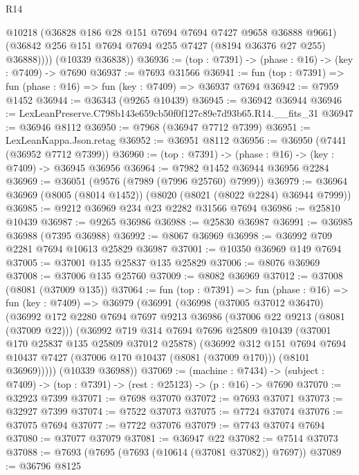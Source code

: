\begin{lexlean}{R14}
\begin{coremodule}
            @10218
            (@36828 @186 @28 @151 @7694 @7694 @7427 @9658 @36888 @9661)
            (@36842 @256 @151 @7694 @7694 @255 @7427 (@8194 @36376 @27 @255) @36888))))
      (@10339 @36838))
@36936 := (top : @7391) -> (phase : @16) -> (key : @7409) -> @7690
@36937 := @7693 @31566
@36941 := fun (top : @7391) => fun (phase : @16) => fun (key : @7409) => @36937 @7694
@36942 := @7959 @1452
@36944 := @36343 (@9265 @10439)
@36945 := @36942 @36944
@36946 := LexLeanPreserve.C798b143e659cb50f0f127c89e7d93b65.R14.__fits_31
@36947 := @36946 @8112
@36950 := @7968 (@36947 @7712 @7399)
@36951 := LexLeanKappa.Json.retag
@36952 := @36951 @8112
@36956 := @36950 (@7441 (@36952 @7712 @7399))
@36960 := (top : @7391) -> (phase : @16) -> (key : @7409) -> @36945 @36956
@36964 := @7982 @1452 @36944 @36956 @2284
@36969 := @36051 (@9576 (@7989 (@7996 @25760) @7999))
@36979 := @36964 @36969 (@8005 (@8014 @1452)) (@8020 (@8021 (@8022 @2284) @36944 @7999))
@36985 := @9212 @36969 @234 @23 @2282 @31566 @7694
@36986 := @25810 @10439
@36987 := @9265 @36986
@36988 := @25830 @36987
@36991 := @36985 @36988 (@7395 @36988)
@36992 := @8067 @36969
@36998 := @36992 @709 @2281 @7694 @10613 @25829 @36987
@37001 := @10350 @36969 @149 @7694
@37005 := @37001 @135 @25837 @135 @25829
@37006 := @8076 @36969
@37008 := @37006 @135 @25760
@37009 := @8082 @36969
@37012 := @37008 (@8081 (@37009 @135))
@37064 := fun (top : @7391) =>
  fun (phase : @16) =>
  fun (key : @7409) =>
  @36979
    (@36991
      (@36998
        (@37005 @37012 @36470)
        (@36992
          @172
          @2280
          @7694
          @7697
          @9213
          @36986
          (@37006 @22 @9213 (@8081 (@37009 @22)))
          (@36992
            @719
            @314
            @7694
            @7696
            @25809
            @10439
            (@37001 @170 @25837 @135 @25809 @37012 @25878)
            (@36992
              @312
              @151
              @7694
              @7694
              @10437
              @7427
              (@37006 @170 @10437 (@8081 (@37009 @170)))
              (@8101 @36969)))))
      (@10339 @36988))
@37069 := (machine : @7434) ->
  (subject : @7409) -> (top : @7391) -> (rest : @25123) -> (p : @16) -> @7690
@37070 := @32923 @7399
@37071 := @7698 @37070
@37072 := @7693 @37071
@37073 := @32927 @7399
@37074 := @7522 @37073
@37075 := @7724 @37074
@37076 := @37075 @7694
@37077 := @7722 @37076
@37079 := @7743 @37074 @7694
@37080 := @37077 @37079
@37081 := @36947 @22
@37082 := @7514 @37073
@37088 := @7693 (@7695 (@7693 (@10614 (@37081 @37082)) @7697))
@37089 := @36796 @8125

\end{coremodule}
\end{lexlean}
